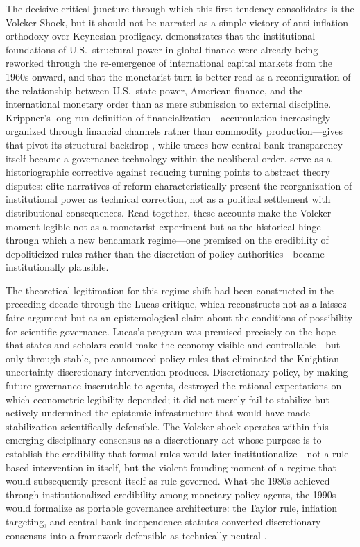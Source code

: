 \documentclass[11pt,a4paper]{article}
\begin{document}
The decisive critical juncture through which this first tendency consolidates is
the Volcker Shock, but it should not be narrated as a simple victory of
anti-inflation orthodoxy over Keynesian profligacy. \citet{Konings2007}
demonstrates that the institutional foundations of U.S.\ structural power in
global finance were already being reworked through the re-emergence of
international capital markets from the 1960s onward, and that the monetarist turn
is better read as a reconfiguration of the relationship between U.S.\ state
power, American finance, and the international monetary order than as mere
submission to external discipline. Krippner's long-run definition of
financialization---accumulation increasingly organized through financial channels
rather than commodity production---gives that pivot its structural backdrop
\citep{Krippner2005}, while \citet{Krippner2007} traces how central bank
transparency itself became a governance technology within the neoliberal order.
\citet{MorganSheehan2015} serve as a historiographic corrective against reducing
turning points to abstract theory disputes: elite narratives of reform
characteristically present the reorganization of institutional power as technical
correction, not as a political settlement with distributional consequences. Read
together, these accounts make the Volcker moment legible not as a monetarist
experiment but as the historical hinge through which a new benchmark
regime---one premised on the credibility of depoliticized rules rather than the
discretion of policy authorities---became institutionally plausible.

The theoretical legitimation for this regime shift had been constructed in the
preceding decade through the Lucas critique, which \citet{Johnson2024}
reconstructs not as a laissez-faire argument but as an epistemological claim about
the conditions of possibility for scientific governance. Lucas's program was
premised precisely on the hope that states and scholars could make the economy
visible and controllable---but only through stable, pre-announced policy rules
that eliminated the Knightian uncertainty discretionary intervention produces.
Discretionary policy, by making future governance inscrutable to agents, destroyed
the rational expectations on which econometric legibility depended; it did not
merely fail to stabilize but actively undermined the epistemic infrastructure that
would have made stabilization scientifically defensible. The Volcker shock
operates within this emerging disciplinary consensus as a discretionary act whose
purpose is to establish the credibility that formal rules would later
institutionalize---not a rule-based intervention in itself, but the violent
founding moment of a regime that would subsequently present itself as
rule-governed. What the 1980s achieved through institutionalized credibility among
monetary policy agents, the 1990s would formalize as portable governance
architecture: the Taylor rule, inflation targeting, and central bank independence
statutes converted discretionary consensus into a framework defensible as
technically neutral \citep{Johnson2024,Taylor1993}.
\end{document}
